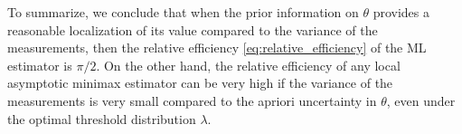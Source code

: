 \documentclass[letterpaper, conference]{IEEEtran}      %
\begin{document}
To summarize, we conclude that when the prior information on $\theta$ provides a reasonable localization of its value compared to the variance of the measurements, then the relative efficiency \eqref{eq:relative_efficiency} of the ML estimator is $\pi/2$. On the other hand, the relative efficiency of any local asymptotic minimax estimator can be very high if the variance of the measurements is very small compared to the apriori uncertainty in $\theta$, even under the optimal threshold distribution $\lambda$. 

\end{document}
